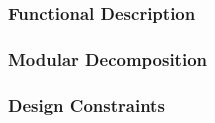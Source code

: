 \subsubsection{Functional Description}

\subsubsection{Modular Decomposition}

\subsubsection{Design Constraints}
